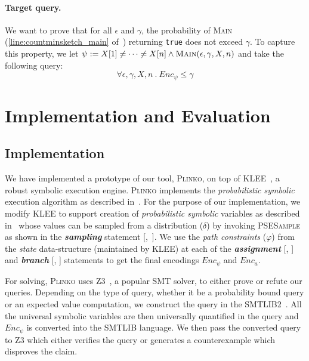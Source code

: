 \documentclass[acmsmall,review,anonymous]{acmart}\settopmatter{printfolios=true,printccs=false,printacmref=false}
\newcommand{\SYSTEM}{\textsc{Plinko}\xspace}
\begin{document}
\paragraph*{Target query.}
We want to prove that for all $\epsilon$ and $\gamma$, the probability of \textsc{Main} (\cref{line:countminsketch_main} of~) returning \texttt{true} does not exceed $\gamma$.
% 
To capture this property, we let $\psi := X[1] \neq \cdots \neq X[n] \wedge \textsc{Main}(\epsilon,\gamma,X,n)$ and take the following query:
\begin{equation*}
  \forall \epsilon,\gamma,X,n~.~Enc_\psi \leq \gamma
\end{equation*}

\section{Implementation and Evaluation}
\label{sec:impl_and_eval}

\subsection{Implementation}
\label{sec:implementation}

We have implemented a prototype of our tool, \SYSTEM, on top of \textsc{KLEE}~\citep{cadar2008}, a robust symbolic execution engine.  \SYSTEM implements the \textit{probabilistic symbolic} execution algorithm as described in~. For the purpose of our implementation, we modify \textsc{KLEE} to support creation of \textit{probabilistic symbolic} variables as described in~ whose values can be sampled from a distribution ($\delta$) by invoking \textsc{PSESample} as shown in the \textbf{\textit{sampling}} statement [,~]. We use the  \textit{path constraints} ($\varphi$)  from the \textit{state} data-structure (maintained by \textsc{KLEE}) at each of the \textbf{\textit{assignment}} [, ] and \textbf{\textit{branch}} [, ] statements to get the final encodings $Enc_\psi$ and $Enc_a$.


For solving, \SYSTEM uses Z3~\citep{demoura2008}, a popular SMT solver, to either prove or refute our queries.
% 
Depending on the type of query, whether it be a probability bound query or an
expected value computation, we construct the query in the SMTLIB2~\citep{smtlib}.
% 
All the universal symbolic variables are then universally quantified in the query and $Enc_\psi$ is converted into the SMTLIB language.
% 
We then pass the converted query to Z3 which either verifies the query or generates a counterexample which disproves the claim.
\end{document}
